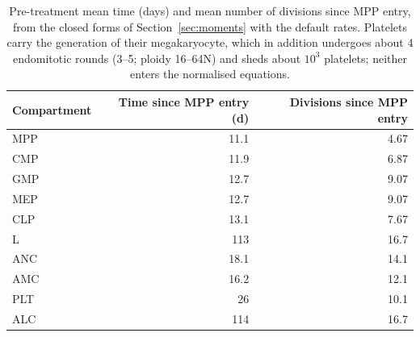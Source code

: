 \begin{table}[!htbp]
\centering
\small
\setlength{\tabcolsep}{3.5pt}
\caption{Pre-treatment mean time (days) and mean number of divisions since MPP entry, from the closed forms of Section~\ref{sec:moments} with the default rates. Platelets carry the generation of their megakaryocyte, which in addition undergoes about 4 endomitotic rounds (3--5; ploidy 16--64N) and sheds about $10^{3}$ platelets; neither enters the normalised equations.}
\label{tab:steady}
\begin{tabular}{lrr}
\toprule
Compartment & Time since MPP entry (d) & Divisions since MPP entry \\
\midrule
MPP & 11.1 & 4.67 \\
CMP & 11.9 & 6.87 \\
GMP & 12.7 & 9.07 \\
MEP & 12.7 & 9.07 \\
CLP & 13.1 & 7.67 \\
L & 113 & 16.7 \\
ANC & 18.1 & 14.1 \\
AMC & 16.2 & 12.1 \\
PLT & 26 & 10.1 \\
ALC & 114 & 16.7 \\
\bottomrule
\end{tabular}
\end{table}

